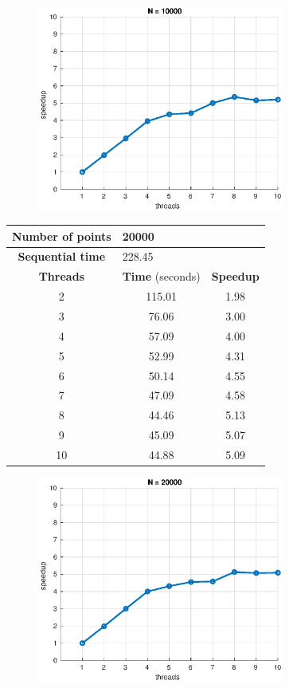 \documentclass[10pt,twocolumn,letterpaper]{article}
\begin{document}
\begin{figure}[H]
\centering
\includegraphics[width=3.2in]{fig/speedup10000.eps}
\end{figure}

\begin{table}[H]
\centering
\begin{tabular}{ccc}
\hline
\textbf{Number of points} & \multicolumn{2}{l}{20000} \\
\hline
\textbf{Sequential time} & \multicolumn{2}{l}{228.45} \\
\hline
\textbf{Threads} & \textbf{Time} (seconds) & \textbf{Speedup} \\
\hline
2 & 115.01 & 1.98 \\
3 & 76.06 & 3.00 \\
4 & 57.09 & 4.00 \\
5 & 52.99 & 4.31 \\
6 & 50.14 & 4.55 \\
7 & 47.09 & 4.58 \\
8 & 44.46 & 5.13 \\
9 & 45.09 & 5.07 \\
10 & 44.88 & 5.09 \\
\hline
\end{tabular}
\end{table}

\begin{figure}[H]
\centering
\includegraphics[width=3.2in]{fig/speedup20000.eps}
\end{figure}
\end{document}

